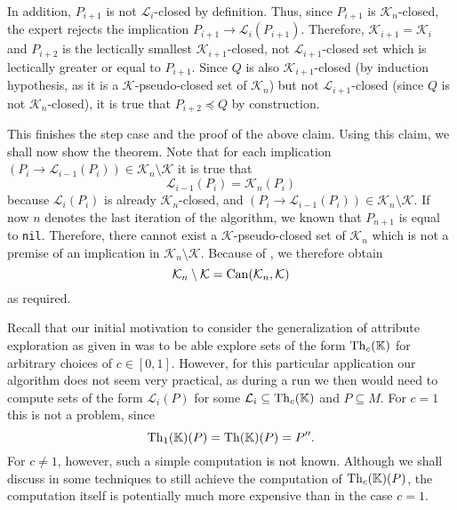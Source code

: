 \begin{Proof}
  In addition, $P_{i+1}$ is not $\mathcal{L}_{i}$-closed by definition.  Thus, since
  $P_{i+1}$ is $\mathcal{K}_{n}$-closed, the expert rejects the implication $P_{i+1} \to
  \mathcal{L}_{i}(P_{i+1})$.  Therefore, $\mathcal{K}_{i+1} = \mathcal{K}_{i}$ and
  $P_{i+2}$ is the lectically smallest $\mathcal{K}_{i+1}$-closed, not
  $\mathcal{L}_{i+1}$-closed set which is lectically greater or equal to $P_{i+1}$.  Since
  $Q$ is also $\mathcal{K}_{i+1}$-closed (by induction hypothesis, as it is a
  $\mathcal{K}$-pseudo-closed set of $\mathcal{K}_{n}$) but not $\mathcal{L}_{i+1}$-closed
  (since $Q$ is not $\mathcal{K}_{n}$-closed), it is true that $P_{i+2} \preceq Q$ by
  construction.

  This finishes the step case and the proof of the above claim.  Using this claim, we
  shall now show the theorem.  Note that for each implication $(P_{i} \to
  \mathcal{L}_{i-1}(P_{i})) \in \mathcal{K}_{n} \setminus \mathcal{K}$ it is true that
  \begin{equation}
    \label{eq:38}
    \mathcal{L}_{i-1}(P_{i}) = \mathcal{K}_{n}(P_{i})
  \end{equation}
  because $\mathcal{L}_{i}(P_{i})$ is already $\mathcal{K}_{n}$-closed, and $(P_{i} \to
  \mathcal{L}_{i-1}(P_{i})) \in \mathcal{K}_{n} \setminus \mathcal{K}$.  If now $n$
  denotes the last iteration of the algorithm, we known that $P_{n+1}$ is equal to
  \lstinline{nil}.  Therefore, there cannot exist a $\mathcal{K}$-pseudo-closed set of
  $\mathcal{K}_{n}$ which is not a premise of an implication in $\mathcal{K}_{n} \setminus
  \mathcal{K}$.  Because of , we therefore obtain
  \begin{equation*}
    \mathcal{K}_{n} \setminus \mathcal{K} = \operatorname{Can}(\mathcal{K}_{n}, \mathcal{K})
  \end{equation*}
  as required.
\end{Proof}

Recall that our initial motivation to consider the generalization of attribute exploration
as given in  was to be able explore sets of the form
$\operatorname{Th}_{c}({\mathbb{K}})$ for arbitrary choices of $c \in [0,1]$.  However, for this particular
application our algorithm does not seem very practical, as during a run we then would need
to compute sets of the form $\mathcal{L}_{i}(P)$ for some $\mathcal{L}_{i} \subseteq
\operatorname{Th}_{c}({\mathbb{K}})$ and $P \subseteq M$.  For $c = 1$ this is not a problem, since
\begin{equation*}
  \operatorname{Th}_{1}({\mathbb{K}})(P) = \operatorname{Th}({\mathbb{K}})(P) = P''.
\end{equation*}
For $c \neq 1$, however, such a simple computation is not known.  Although we shall
discuss in  some techniques to still achieve the computation of
$\operatorname{Th}_{c}({\mathbb{K}})(P)$, the computation itself is potentially much more expensive than in
the case $c = 1$.

